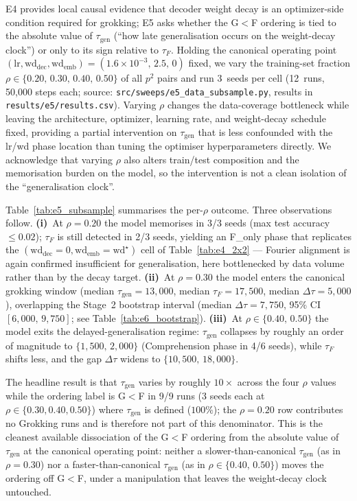 \documentclass{article}
\newcommand{\taug}{\tau_{\mathrm{gen}}}
\newcommand{\tauf}{\tau_{F}}
\newcommand{\Dtau}{\Delta\tau}
\begin{document}
E4 provides local causal evidence that decoder weight decay is an
optimizer-side condition required for grokking; E5 asks whether the
G$<$F ordering is tied to the absolute value
of $\taug$ (``how late generalisation occurs on the weight-decay
clock'') or only to its sign relative to $\tauf$.
Holding the canonical operating point
$(\mathrm{lr},\mathrm{wd}_{\mathrm{dec}},\mathrm{wd}_{\mathrm{emb}}){=}
(1.6{\times}10^{-3},\,2.5,\,0)$ fixed, we vary the training-set
fraction $\rho\in\{0.20,\,0.30,\,0.40,\,0.50\}$ of all $p^{2}$
pairs and run 3~seeds per cell (12~runs, 50{,}000 steps each;
source: \texttt{src/sweeps/e5\_data\_subsample.py},
results in \texttt{results/e5/results.csv}).
Varying $\rho$ changes the data-coverage bottleneck while
leaving the architecture, optimizer, learning rate, and
weight-decay schedule fixed, providing a partial intervention on
$\taug$ that is less confounded with the lr/wd phase location
than tuning the optimiser hyperparameters directly.
We acknowledge that varying $\rho$ also alters train/test
composition and the memorisation burden on the model, so the
intervention is not a clean isolation of the ``generalisation
clock''.

Table~\ref{tab:e5_subsample} summarises the per-$\rho$ outcome.
Three observations follow.
\textbf{(i)}~At $\rho{=}0.20$ the model memorises in 3/3 seeds
(max test accuracy $\leq 0.02$); $\tauf$ is still detected in
2/3 seeds, yielding an F\_only phase that replicates the
$(\mathrm{wd}_{\mathrm{dec}}{=}0,\mathrm{wd}_{\mathrm{emb}}{=}\mathrm{wd}^{\star})$
cell of Table~\ref{tab:e4_2x2} --- Fourier alignment is
again confirmed insufficient for generalisation, here
bottlenecked by data volume rather than by the decay target.
\textbf{(ii)}~At $\rho{=}0.30$ the model enters the canonical
grokking window (median $\taug{=}13{,}000$, median $\tauf{=}17{,}500$,
median $\Dtau{=}5{,}000$), overlapping the Stage~2 bootstrap
interval (median $\Dtau{=}7{,}750$, 95\% CI $[6{,}000,\,9{,}750]$;
see Table~\ref{tab:e6_bootstrap}).
\textbf{(iii)}~At $\rho\in\{0.40,\,0.50\}$ the model exits the
delayed-generalisation regime: $\taug$ collapses by roughly an
order of magnitude to $\{1{,}500,\,2{,}000\}$ (Comprehension
phase in 4/6 seeds), while $\tauf$ shifts less, and the gap
$\Dtau$ widens to $\{10{,}500,\,18{,}000\}$.

The headline result is that $\taug$ varies by roughly $10\times$
across the four $\rho$ values while the ordering label is G$<$F
in 9/9 runs (3 seeds each at $\rho\in\{0.30, 0.40, 0.50\}$) where
$\taug$ is defined ($100\%$); the $\rho{=}0.20$ row contributes
no Grokking runs and is therefore not part of this denominator.
This is the cleanest available dissociation of the G$<$F ordering
from the absolute value of $\taug$ at the canonical operating
point: neither a slower-than-canonical $\taug$ (as in
$\rho{=}0.30$) nor a faster-than-canonical $\taug$ (as in
$\rho\in\{0.40,\,0.50\}$) moves the ordering off G$<$F, under a
manipulation that leaves the weight-decay clock untouched.
\end{document}
